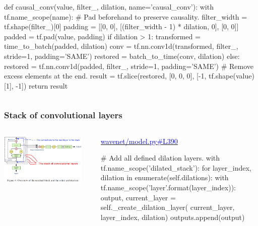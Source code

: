 \documentclass[8pt]{beamer}
\begin{document}
\begin{frame}[fragile]
\begin{columns}
\begin{column}{0.5\textwidth}
\begin{verbnobox}[\tiny]
def causal_conv(value, filter_, dilation, name='causal_conv'):
    with tf.name_scope(name):
        # Pad beforehand to preserve causality.
        filter_width = tf.shape(filter_)[0]
        padding = [[0, 0], [(filter_width - 1) * dilation, 0], [0, 0]]
        padded = tf.pad(value, padding)
        if dilation > 1:
            transformed = time_to_batch(padded, dilation)
            conv = tf.nn.conv1d(transformed, filter_, stride=1, padding='SAME')
            restored = batch_to_time(conv, dilation)
        else:
            restored = tf.nn.conv1d(padded, filter_, stride=1, padding='SAME')
        # Remove excess elements at the end.
        result = tf.slice(restored,
                          [0, 0, 0],
                          [-1, tf.shape(value)[1], -1])
    return result
 \end{verbnobox}
\end{column}
\end{columns} 
 
\end{frame}

\begin{frame}[fragile]
\frametitle{Stack of convolutional layers}
\begin{columns}
\begin{column}{0.5\textwidth}
 
\includegraphics[width=0.9\textwidth]{./dl3_images/stack_of_convolutional_layers.png}

\end{column}
\begin{column}{0.5\textwidth}
 
 \href{https://github.com/ibab/tensorflow-wavenet/blob/master/wavenet/model.py\#L390}{\textcolor{blue}{wavenet/model.py\#L390}}
 
 \begin{verbnobox}[\tiny]
  # Add all defined dilation layers.
  with tf.name_scope('dilated_stack'):
      for layer_index, dilation in enumerate(self.dilations):
          with tf.name_scope('layer{}'.format(layer_index)):
              output, current_layer = self._create_dilation_layer(
                  current_layer, layer_index, dilation)
              outputs.append(output)
 \end{verbnobox}
\end{column}
\end{columns} 
 
\end{frame}
\end{document}
